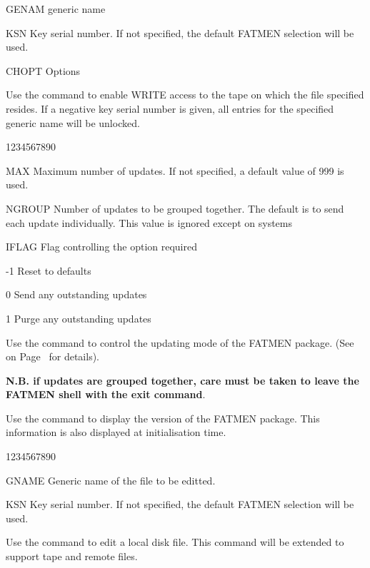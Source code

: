 \begin{XMP}
\item[GENAM]generic name
\item[KSN]Key serial number. If not specified, the default FATMEN
selection will be used.
\item[CHOPT]Options
\end{XMP}

Use the  command to enable WRITE access to the tape on which               
the file specified resides. If a negative key serial number is given,           
all entries for the specified generic name will be unlocked.                    


\begin{DLtt}{1234567890}
\item[MAX]Maximum number of updates. If not specified, a default value
of 999 is used.
\item[NGROUP]Number of updates to be grouped together. The default
is to send each update individually. This value is ignored except
on  systems
\item[IFLAG]Flag controlling the option required
\begin{DLtt}{12}
\item[-1]Reset to defaults
\item[0]Send any outstanding updates
\item[1]Purge any outstanding updates
\end{DLtt}
\end{DLtt}

Use the  command to control the updating mode of the FATMEN
package. (See on Page~\pageref{FMUPDT} for details).

{\bf N.B. if updates are grouped together, care must be taken
to leave the FATMEN shell with the exit command}.

Use the  command to display the version of the FATMEN package.
This information is also displayed at initialisation time.

\begin{DLtt}{1234567890}
\item[GNAME]Generic name of the file to be editted.
\item[KSN]Key serial number. If not specified, the default
FATMEN selection will be used.
\end{DLtt}
Use the  command to edit a local disk file.
This command will be extended to support tape and remote files.

